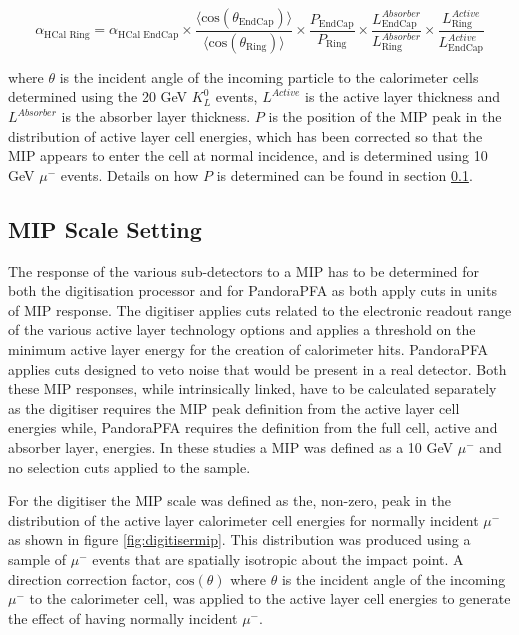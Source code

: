 \begin{equation}
\alpha_{\text{HCal Ring}} = \alpha_{\text{HCal EndCap}} \times \frac{\langle \text{cos}(\theta_\text{EndCap}) \rangle}{\langle \text{cos}(\theta_\text{Ring}) \rangle} \times \frac{P_\text{EndCap} }{P_\text{Ring} } \times \frac{L^{Absorber}_\text{EndCap}}{L^{Absorber}_\text{Ring} } \times \frac{L^{Active}_\text{Ring}}{L^{Active}_\text{EndCap}}
\end{equation}

where $\theta$ is the incident angle of the incoming particle to the calorimeter cells determined using the 20 GeV $K^{0}_{L}$ events, $L^{Active}$ is the active layer thickness and $L^{Absorber}$ is the absorber layer thickness. $P$ is the position of the MIP peak in the distribution of active layer cell energies, which has been corrected so that the MIP appears to enter the cell at normal incidence, and is determined using 10 GeV $\mu^{-}$ events.  Details on how $P$ is determined can be found in section \ref{sec:mipresponse}.


\subsection{MIP Scale Setting}
\label{sec:mipresponse}
The response of the various sub-detectors to a MIP has to be determined for both the digitisation processor and for PandoraPFA as both apply cuts in units of MIP response.  The digitiser applies cuts related to the electronic readout range of the various active layer technology options and applies a threshold on the minimum active layer energy for the creation of calorimeter hits.  PandoraPFA applies cuts designed to veto noise that would be present in a real detector.  Both these MIP responses, while intrinsically linked, have to be calculated separately as the digitiser requires the MIP peak definition from the active layer cell energies while, PandoraPFA requires the definition from the full cell, active and absorber layer, energies.  In these studies a MIP was defined as a 10 GeV $\mu^{-}$ \cite{Bichsel:2004ej} and no selection cuts applied to the sample.  

For the digitiser the MIP scale was defined as the, non-zero, peak in the distribution of the active layer calorimeter cell energies for normally incident $\mu^{-}$ as shown in figure \ref{fig:digitisermip}.  This distribution was produced using a sample of $\mu^{-}$ events that are spatially isotropic about the impact point.  A direction correction factor, $\text{cos}(\theta)$ where $\theta$ is the incident angle of the incoming $\mu^{-}$ to the calorimeter cell, was applied to the active layer cell energies to generate the effect of having normally incident $\mu^{-}$.  

